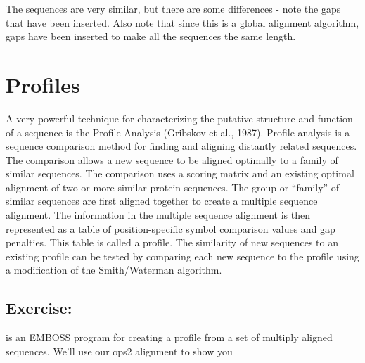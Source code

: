 \documentclass[12pt]{report}
\begin{document}
The sequences are very similar, but there are some differences - note
the gaps that have been inserted. Also note that since this is a
global alignment algorithm, gaps have been inserted to make all the
sequences the same length.

\section{Profiles}
A very powerful technique for characterizing the putative structure
and function of a sequence is the Profile Analysis (Gribskov et al.,
1987).  Profile analysis is a sequence comparison method for finding
and aligning distantly related sequences. The comparison allows a new
sequence to be aligned optimally to a family of similar sequences.
The comparison uses a scoring matrix and an existing optimal alignment
of two or more similar protein sequences.  The group or ``family'' of
similar sequences are first aligned together to create a multiple
sequence alignment. The information in the multiple sequence alignment
is then represented as a table of position-specific
symbol comparison values and gap penalties.  This table is called a
profile. The similarity of new sequences to an existing profile can
be tested by comparing each new sequence to the profile using a
modification of the Smith/Waterman algorithm.

\subsection*{Exercise: }

 is an EMBOSS program for creating 
a profile from a set of multiply aligned sequences. We'll use our ops2
alignment to show you 

\unix{}\\
\\
\\
\\
\\
\\
\\
\\
\\
\\
\\
\\
\\
\end{document}
